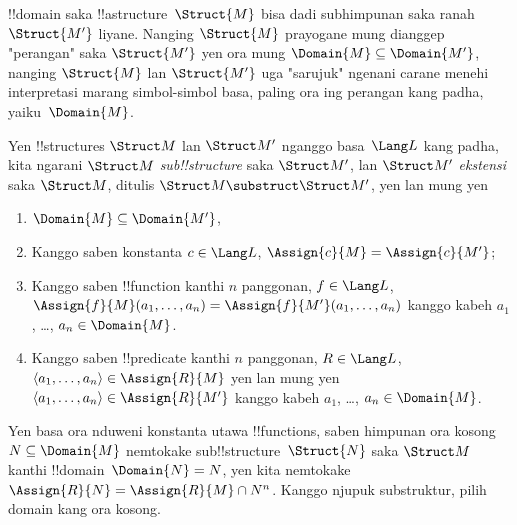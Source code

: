 \documentclass[../../../include/open-logic-section]{subfiles}
\begin{document}

!!{domain} saka !!a{structure}~$\Struct{M}$
bisa dadi subhimpunan saka ranah
$\Struct{M'}$ liyane. Nanging
$\Struct{M}$ prayogane mung dianggep
"perangan" saka $\Struct{M'}$
yen ora mung $\Domain{M}
\subseteq \Domain{M'}$, nanging
$\Struct{M}$ lan $\Struct{M'}$
uga "sarujuk" ngenani carane
menehi interpretasi marang
simbol-simbol basa, paling
ora ing perangan
kang padha, yaiku~$\Domain{M}$.

\begin{defn}
Yen !!{structure}s $\Struct M$
lan $\Struct M'$ nganggo
basa~$\Lang L$ kang padha,
kita ngarani $\Struct M$
\emph{sub!!{structure}}
saka $\Struct M'$, lan
$\Struct M'$ \emph{ekstensi}
saka $\Struct M$, ditulis
$\Struct M \substruct \Struct M'$,
yen lan mung yen
\begin{enumerate}
\item $\Domain{M} \subseteq \Domain{M'}$,
\item Kanggo saben konstanta $c \in \Lang L$,
  $\Assign{c}{M} =
    \Assign{c}{M'}$;
\item Kanggo saben !!{function} kanthi $n$ panggonan,
  $f \in \Lang L$,
  $\Assign{f}{M}(a_1, \dots, a_n) = \Assign{f}{M'}(a_1, \dots, a_n)$
  kanggo kabeh $a_1$, \dots, $a_n \in \Domain{M}$.
\item Kanggo saben !!{predicate} kanthi $n$ panggonan,
  $R \in \Lang L$, $\langle
  a_1, \dots, a_n\rangle \in \Assign{R}{M}$
  yen lan mung yen $\langle a_1, \dots,
  a_n\rangle \in \Assign{R}{M'}$
  kanggo kabeh $a_1$, \dots, $a_n \in
  \Domain{M}$.
\end{enumerate}
\end{defn}

\begin{rem}
Yen basa ora nduweni konstanta
utawa !!{function}s, saben
himpunan ora kosong $N
\subseteq \Domain{M}$
nemtokake sub!!{structure}~$\Struct{N}$
saka $\Struct M$ kanthi
!!{domain}~$\Domain{N} = N$,
yen kita nemtokake $\Assign{R}{N} =
\Assign{R}{M} \cap N^n$.
Kanggo njupuk substruktur, pilih domain kang ora kosong.
\end{rem}

\end{document}
